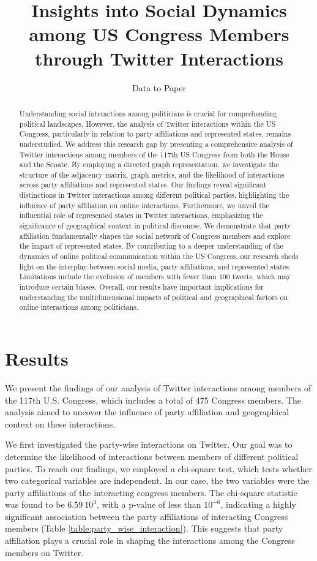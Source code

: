 \documentclass[11pt]{article}
\title{Insights into Social Dynamics among US Congress Members through Twitter Interactions}
\author{Data to Paper}
\begin{document}
\maketitle
\begin{abstract}
Understanding social interactions among politicians is crucial for comprehending political landscapes. However, the analysis of Twitter interactions within the US Congress, particularly in relation to party affiliations and represented states, remains understudied. We address this research gap by presenting a comprehensive analysis of Twitter interactions among members of the 117th US Congress from both the House and the Senate. By employing a directed graph representation, we investigate the structure of the adjacency matrix, graph metrics, and the likelihood of interactions across party affiliations and represented states. Our findings reveal significant distinctions in Twitter interactions among different political parties, highlighting the influence of party affiliation on online interactions. Furthermore, we unveil the influential role of represented states in Twitter interactions, emphasizing the significance of geographical context in political discourse. We demonstrate that party affiliation fundamentally shapes the social network of Congress members and explore the impact of represented states. By contributing to a deeper understanding of the dynamics of online political communication within the US Congress, our research sheds light on the interplay between social media, party affiliations, and represented states. Limitations include the exclusion of members with fewer than 100 tweets, which may introduce certain biases. Overall, our results have important implications for understanding the multidimensional impacts of political and geographical factors on online interactions among politicians.
\end{abstract}
\section*{Results}

We present the findings of our analysis of Twitter interactions among members of the 117th U.S. Congress, which includes a total of 475 Congress members. The analysis aimed to uncover the influence of party affiliation and geographical context on these interactions. 

We first investigated the party-wise interactions on Twitter. Our goal was to determine the likelihood of interactions between members of different political parties. To reach our findings, we employed a chi-square test, which tests whether two categorical variables are independent. In our case, the two variables were the party affiliations of the interacting congress members. The chi-square statistic was found to be $6.59\ 10^{3}$, with a p-value of less than $10^{-6}$, indicating a highly significant association between the party affiliations of interacting Congress members (Table \ref{table:party_wise_interaction}). This suggests that party affiliation plays a crucial role in shaping the interactions among the Congress members on Twitter. 
\end{document}
